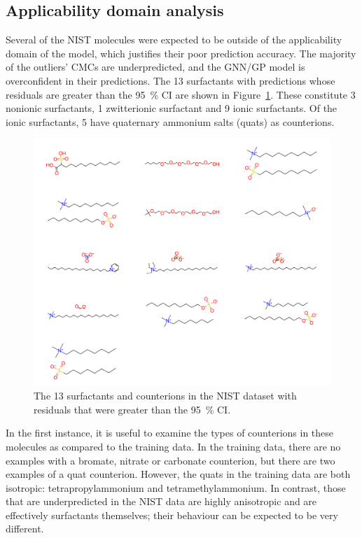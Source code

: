 \subsection{Applicability domain analysis}

Several of the NIST molecules were expected to be outside of the applicability
domain of the model, which justifies their poor prediction accuracy. The
majority of the outliers' CMCs are underpredicted, and the GNN/GP model is
overconfident in their predictions. The 13 surfactants with predictions whose
residuals are greater than the \SI{95}{\%} CI are shown in
Figure~\ref{fig:nist-underpred}. These constitute 3 nonionic surfactants, 1
zwitterionic surfactant and 9 ionic surfactants. Of the ionic surfactants, 5
have quaternary ammonium salts (quats) as counterions.

\begin{figure}
    \includegraphics[width=\textwidth]{images/nist-underpred.pdf}
    \caption{The 13 surfactants and counterions in the NIST dataset with residuals
        that were greater than the \SI{95}{\%} CI.}
    \label{fig:nist-underpred}
\end{figure}

In the first instance, it is useful to examine the types of counterions in these
molecules as compared to the training data. In the training data, there are no
examples with a bromate, nitrate or carbonate counterion, but there are two
examples of a quat counterion. However, the quats in the training data are both
isotropic: tetrapropylammonium and tetramethylammonium. In contrast, those that
are underpredicted in the NIST data are highly anisotropic and are effectively
surfactants themselves; their behaviour can be expected to be very different.

